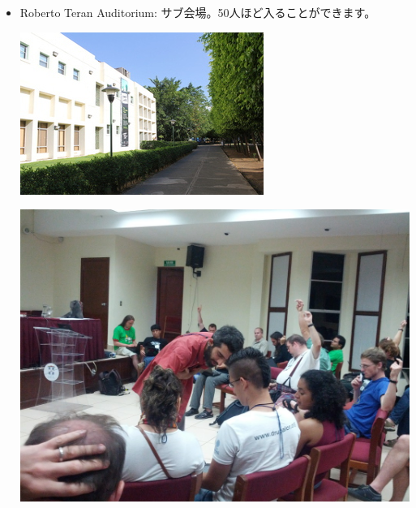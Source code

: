 \documentclass[mingoth,a4paper]{jsarticle}
\begin{document}
\begin{itemize}
  \item Roberto Teran Auditorium: サブ会場。50人ほど入ることができます。\\
        \begin{minipage}{0.4\hsize}
        \includegraphics[width=0.8\hsize]{image201208/debconf12_2ndtalkroom01.jpg}
	\end{minipage}
        \begin{minipage}{0.4\hsize}
        \includegraphics[width=0.8\hsize]{image201208/debconf12_2ndtalkroom02.jpg}
	\end{minipage}


\end{itemize}
\end{document}
